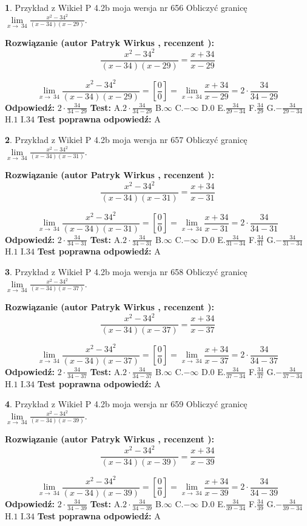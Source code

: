 \documentclass[12pt, a4paper]{article}
\theoremstyle{definition} %
\newtheorem{zad}{}
\newcommand{\zadStart}[1]{\begin{zad}#1\newline}
\newcommand{\zadStop}{\end{zad}}
\newcommand{\rozwStart}[2]{\noindent \textbf{Rozwiązanie (autor #1 , recenzent #2): }\newline}
\newcommand{\rozwStop}{\newline}
\newcommand{\odpStart}{\noindent \textbf{Odpowiedź:}\newline}
\newcommand{\odpStop}{\newline}
\newcommand{\testStart}{\noindent \textbf{Test:}\newline}
\newcommand{\testStop}{\newline}
\newcommand{\kluczStart}{\noindent \textbf{Test poprawna odpowiedź:}\newline}
\newcommand{\kluczStop}{\newline}
\begin{document}
\zadStart{Przykład z Wikieł P 4.2b moja wersja nr 656}
Obliczyć granicę $\lim\limits_{x\to\ 34}\frac{x^{2}-34^{2}}{(x-34)(x-29)}$.
\zadStop
\rozwStart{Patryk Wirkus}{}
$$\frac{x^{2}-34^{2}}{(x-34)(x-29)}=\frac{x+34}{x-29}$$

$$\lim\limits_{x\to\ 34}\frac{x^{2}-34^{2}}{(x-34)(x-29)}=[\frac{0}{0}]=\lim\limits_{x\to\ 34}\frac{x+34}{x-29}=2 \cdot \frac{34}{34-29}$$
\rozwStop
\odpStart
$2 \cdot \frac{34}{34-29}$
\odpStop
\testStart
A.$2 \cdot \frac{34}{34-29}$
B.$\infty$
C.$-\infty$
D.$0$
E.$\frac{34}{29-34}$
F.$\frac{34}{29}$
G.$-\frac{34}{29-34}$
H.$1$
I.$34$
\testStop
\kluczStart
A
\kluczStop



\zadStart{Przykład z Wikieł P 4.2b moja wersja nr 657}
Obliczyć granicę $\lim\limits_{x\to\ 34}\frac{x^{2}-34^{2}}{(x-34)(x-31)}$.
\zadStop
\rozwStart{Patryk Wirkus}{}
$$\frac{x^{2}-34^{2}}{(x-34)(x-31)}=\frac{x+34}{x-31}$$

$$\lim\limits_{x\to\ 34}\frac{x^{2}-34^{2}}{(x-34)(x-31)}=[\frac{0}{0}]=\lim\limits_{x\to\ 34}\frac{x+34}{x-31}=2 \cdot \frac{34}{34-31}$$
\rozwStop
\odpStart
$2 \cdot \frac{34}{34-31}$
\odpStop
\testStart
A.$2 \cdot \frac{34}{34-31}$
B.$\infty$
C.$-\infty$
D.$0$
E.$\frac{34}{31-34}$
F.$\frac{34}{31}$
G.$-\frac{34}{31-34}$
H.$1$
I.$34$
\testStop
\kluczStart
A
\kluczStop



\zadStart{Przykład z Wikieł P 4.2b moja wersja nr 658}
Obliczyć granicę $\lim\limits_{x\to\ 34}\frac{x^{2}-34^{2}}{(x-34)(x-37)}$.
\zadStop
\rozwStart{Patryk Wirkus}{}
$$\frac{x^{2}-34^{2}}{(x-34)(x-37)}=\frac{x+34}{x-37}$$

$$\lim\limits_{x\to\ 34}\frac{x^{2}-34^{2}}{(x-34)(x-37)}=[\frac{0}{0}]=\lim\limits_{x\to\ 34}\frac{x+34}{x-37}=2 \cdot \frac{34}{34-37}$$
\rozwStop
\odpStart
$2 \cdot \frac{34}{34-37}$
\odpStop
\testStart
A.$2 \cdot \frac{34}{34-37}$
B.$\infty$
C.$-\infty$
D.$0$
E.$\frac{34}{37-34}$
F.$\frac{34}{37}$
G.$-\frac{34}{37-34}$
H.$1$
I.$34$
\testStop
\kluczStart
A
\kluczStop



\zadStart{Przykład z Wikieł P 4.2b moja wersja nr 659}
Obliczyć granicę $\lim\limits_{x\to\ 34}\frac{x^{2}-34^{2}}{(x-34)(x-39)}$.
\zadStop
\rozwStart{Patryk Wirkus}{}
$$\frac{x^{2}-34^{2}}{(x-34)(x-39)}=\frac{x+34}{x-39}$$

$$\lim\limits_{x\to\ 34}\frac{x^{2}-34^{2}}{(x-34)(x-39)}=[\frac{0}{0}]=\lim\limits_{x\to\ 34}\frac{x+34}{x-39}=2 \cdot \frac{34}{34-39}$$
\rozwStop
\odpStart
$2 \cdot \frac{34}{34-39}$
\odpStop
\testStart
A.$2 \cdot \frac{34}{34-39}$
B.$\infty$
C.$-\infty$
D.$0$
E.$\frac{34}{39-34}$
F.$\frac{34}{39}$
G.$-\frac{34}{39-34}$
H.$1$
I.$34$
\testStop
\kluczStart
A
\kluczStop
\end{document}
